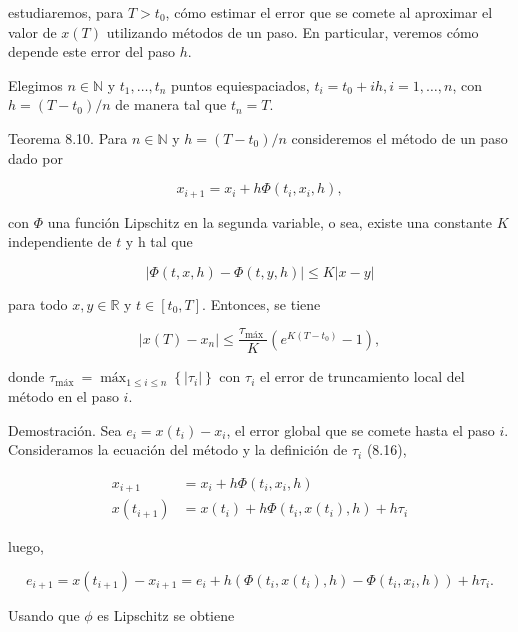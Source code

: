 \documentclass[10pt]{book}
\begin{document}
estudiaremos, para $T>t_{0}$, cómo estimar el error que se comete al aproximar el valor de $x(T)$ utilizando métodos de un paso. En particular, veremos cómo depende este error del paso $h$.

Elegimos $n \in \mathbb{N}$ y $t_{1}, \ldots, t_{n}$ puntos equiespaciados, $t_{i}=t_{0}+i h, i=1, \ldots, n$, con $h=\left(T-t_{0}\right) / n$ de manera tal que $t_{n}=T$.

Teorema 8.10. Para $n \in \mathbb{N}$ y $h=\left(T-t_{0}\right) / n$ consideremos el método de un paso dado por

$$
x_{i+1}=x_{i}+h \Phi\left(t_{i}, x_{i}, h\right),
$$

con $\Phi$ una función Lipschitz en la segunda variable, o sea, existe una constante $K$ independiente de $t$ y h tal que


\begin{equation*}
|\Phi(t, x, h)-\Phi(t, y, h)| \leq K|x-y| \tag{8.19}
\end{equation*}


para todo $x, y \in \mathbb{R}$ y $t \in\left[t_{0}, T\right]$. Entonces, se tiene


\begin{equation*}
\left|x(T)-x_{n}\right| \leq \frac{\tau_{\text {máx }}}{K}\left(e^{K\left(T-t_{0}\right)}-1\right), \tag{8.20}
\end{equation*}


donde $\tau_{\text {máx }}=\operatorname{máx}_{1 \leq i \leq n}\left\{\left|\tau_{i}\right|\right\}$ con $\tau_{i}$ el error de truncamiento local del método en el paso $i$.

Demostración. Sea $e_{i}=x\left(t_{i}\right)-x_{i}$, el error global que se comete hasta el paso $i$.\\
Consideramos la ecuación del método y la definición de $\tau_{i}$ (8.16),

$$
\begin{aligned}
x_{i+1} & =x_{i}+h \Phi\left(t_{i}, x_{i}, h\right) \\
x\left(t_{i+1}\right) & =x\left(t_{i}\right)+h \Phi\left(t_{i}, x\left(t_{i}\right), h\right)+h \tau_{i}
\end{aligned}
$$

luego,

$$
e_{i+1}=x\left(t_{i+1}\right)-x_{i+1}=e_{i}+h\left(\Phi\left(t_{i}, x\left(t_{i}\right), h\right)-\Phi\left(t_{i}, x_{i}, h\right)\right)+h \tau_{i} .
$$

Usando que $\phi$ es Lipschitz se obtiene
\end{document}
